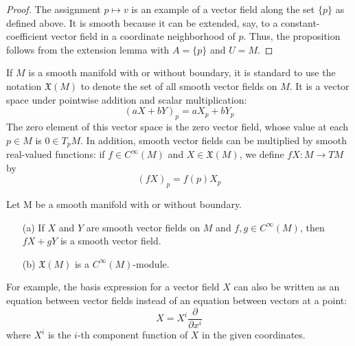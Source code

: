 \begin{proof}
The assignment $p\mapsto v$ is an example of a vector field along the set $\{p\}$ as defined above. It is smooth because it can be extended, say, to a constant-coefficient vector field in a coordinate neighborhood of $p$. Thus, the proposition follows from the extension lemma with $A=\{p\}$ and $U=M$.
\end{proof}
If $M$ is a smooth manifold with or without boundary, it is standard to use the notation $\mathfrak{X}(M)$ to denote the set of all smooth vector fields on $M$. It is a vector space under pointwise addition and scalar multiplication:
\[(aX+bY)_p=aX_p+bY_p\]
The zero element of this vector space is the zero vector field, whose value at each $p\in M$ is $0\in T_pM$. In addition, smooth vector fields can be multiplied by smooth real-valued functions: if $f\in C^\infty(M)$ and $X\in\mathfrak{X}(M)$, we define $fX:M\to TM$ by
\[(fX)_p=f(p)X_p\]
\begin{proposition}
Let M be a smooth manifold with or without boundary.
\begin{itemize}
\item[(a)]If $X$ and $Y$ are smooth vector fields on $M$ and $f,g\in C^\infty(M)$, then $fX+gY$ is a smooth vector field.
\item[(b)] $\mathfrak{X}(M)$ is a $C^\infty(M)$-module.
\end{itemize}
\end{proposition}
For example, the basis expression for a vector field $X$ can also be written as an equation between vector fields instead of an equation between vectors at a point:
\[X=X^i\frac{\partial}{\partial x^i}\]
where $X^i$ is the $i$-th component function of $X$ in the given coordinates.
